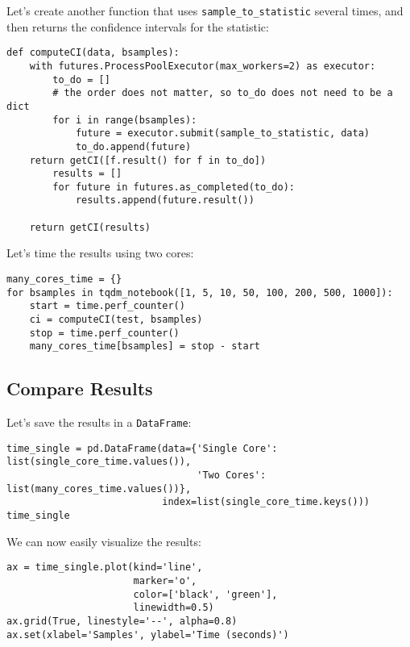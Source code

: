 \documentclass[12pt, a4paper]{article}
\begin{document}
Let's create another function that uses \texttt{sample\_to\_statistic} several times, and then returns the confidence intervals for the statistic:
\lstset{language=jupyter-python,label= ,caption= ,captionpos=b,numbers=none}
\begin{lstlisting}
def computeCI(data, bsamples):
    with futures.ProcessPoolExecutor(max_workers=2) as executor:
        to_do = []
        # the order does not matter, so to_do does not need to be a dict
        for i in range(bsamples):
            future = executor.submit(sample_to_statistic, data)
            to_do.append(future)
    return getCI([f.result() for f in to_do])
        results = []
        for future in futures.as_completed(to_do):
            results.append(future.result())

    return getCI(results)
\end{lstlisting}

Let's time the results using two cores:
\lstset{language=jupyter-python,label= ,caption= ,captionpos=b,numbers=none}
\begin{lstlisting}
many_cores_time = {}
for bsamples in tqdm_notebook([1, 5, 10, 50, 100, 200, 500, 1000]):
    start = time.perf_counter()
    ci = computeCI(test, bsamples)
    stop = time.perf_counter()
    many_cores_time[bsamples] = stop - start
\end{lstlisting}

\subsection{Compare Results}
\label{sec:org3e4cac1}
Let's save the results in a \texttt{DataFrame}:
\lstset{language=jupyter-python,label= ,caption= ,captionpos=b,numbers=none}
\begin{lstlisting}
time_single = pd.DataFrame(data={'Single Core': list(single_core_time.values()),
                                 'Two Cores': list(many_cores_time.values())},
                           index=list(single_core_time.keys()))
time_single
\end{lstlisting}

We can now easily visualize the results:
\lstset{language=jupyter-python,label= ,caption= ,captionpos=b,numbers=none}
\begin{lstlisting}
ax = time_single.plot(kind='line',
                      marker='o',
                      color=['black', 'green'],
                      linewidth=0.5)
ax.grid(True, linestyle='--', alpha=0.8)
ax.set(xlabel='Samples', ylabel='Time (seconds)')
\end{lstlisting}
\end{document}
